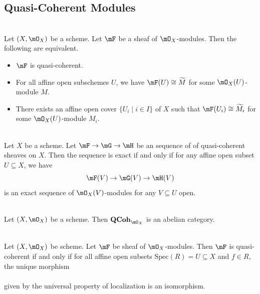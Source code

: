 \documentclass[a4paper]{article}
\begin{document}
\subsection{Quasi-Coherent Modules}
\begin{prp}{}{}\\
Let $(X,\mO_X)$ be a scheme. Let $\mF$ be a sheaf of $\mO_X$-modules. Then the following are equivalent. 
\begin{itemize}
\item $\mF$ is quasi-coherent. 
\item For all affine open subschemes $U$, we have $\mF(U)\cong\widetilde{M}$ for some $\mO_X(U)$-module $M$. 
\item There exists an affine open cover $\{U_i\;|\;i\in I\}$ of $X$ such that $\mF(U_i)\cong\widetilde{M_i}$ for some $\mO_X(U)$-module $M_i$. 
\end{itemize}
\end{prp}

\begin{prp}{}{}\\
Let $X$ be a scheme. Let $\mF\to\mG\to\mH$ be an sequence of of quasi-coherent sheaves on $X$. Then the sequence is exact if and only if for any affine open subset $U\subseteq X$, we have $$\mF(V)\to\mG(V)\to\mH(V)$$ is an exact sequence of $\mO_X(V)$-modules for any $V\subseteq U$ open. 
\end{prp}

\begin{prp}{}{}\\
Let $(X,\mO_X)$ be a scheme. Then $\bold{QCoh}_{\mO_X}$ is an abelian category. 
\end{prp}

\begin{prp}{}{}\\
Let $(X,\mO_X)$ be scheme. Let $\mF$ be sheaf of $\mO_X$-modules. Then $\mF$ is quasi-coherent if and only if for all affine open subsets $\text{Spec}(R)=U\subseteq X$ and $f\in R$, the unique morphism \\
\\
given by the universal property of localization is an isomorphism. 
\end{prp}
\end{document}
